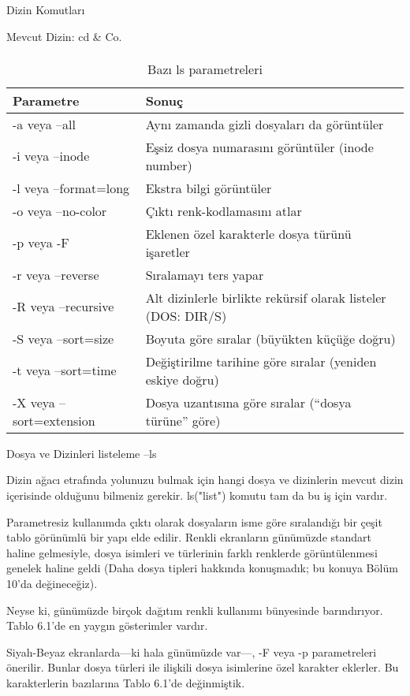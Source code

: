 \documentclass[10pt,a5paper]{book}
\begin{document}
\begin{section}{Dizin Komutları}
\begin{subsection}{Mevcut Dizin: cd \& Co.}
\paragraph{}{
\begin {table}[H]
\caption {Bazı ls parametreleri} \label{tab:title} 
\begin{tabular}{l l}
\hline
Parametre & Sonuç \\
\hline
-a veya --all 	&	Aynı zamanda gizli dosyaları da görüntüler \\
-i veya --inode 	&	Eşsiz dosya numarasını görüntüler (inode number) \\
-l veya --format=long 	&	Ekstra bilgi görüntüler \\
-o veya --no-color 	&	Çıktı renk-kodlamasını atlar \\
-p veya -F 	&	Eklenen özel karakterle dosya türünü işaretler \\
-r veya --reverse 	&	Sıralamayı ters yapar \\
-R veya --recursive 	&	Alt dizinlerle birlikte rekürsif olarak listeler (DOS: DIR/S) \\
-S veya --sort=size 	&	Boyuta göre sıralar (büyükten küçüğe doğru) \\
-t veya --sort=time 	&	Değiştirilme tarihine göre sıralar (yeniden eskiye doğru) \\
-X veya --sort=extension 	&	Dosya uzantısına göre sıralar (“dosya türüne” göre) \\
\hline
\end{tabular}
\end {table}
}
\end{subsection}
\begin{subsection}{Dosya ve Dizinleri listeleme --ls}

Dizin ağacı etrafında yolunuzu bulmak için hangi dosya ve dizinlerin mevcut dizin içerisinde olduğunu bilmeniz gerekir. ls("list") komutu tam da bu iş için vardır.

	Parametresiz kullanımda çıktı olarak dosyaların isme göre sıralandığı bir çeşit tablo görünümlü bir yapı elde edilir. Renkli ekranların günümüzde standart haline gelmesiyle, dosya isimleri ve türlerinin farklı renklerde görüntülenmesi genelek haline geldi (Daha dosya tipleri hakkında konuşmadık; bu konuya Bölüm 10'da değineceğiz).
	
Neyse ki, günümüzde birçok dağıtım renkli kullanımı bünyesinde barındırıyor. Tablo 6.1'de en yaygın gösterimler vardır.

	Siyah-Beyaz ekranlarda—ki hala günümüzde var—, -F veya -p parametreleri önerilir. Bunlar dosya türleri ile ilişkili dosya isimlerine özel karakter eklerler. Bu karakterlerin bazılarına Tablo 6.1'de değinmiştik.
	

\end{subsection}
\end{section}
\end{document}
